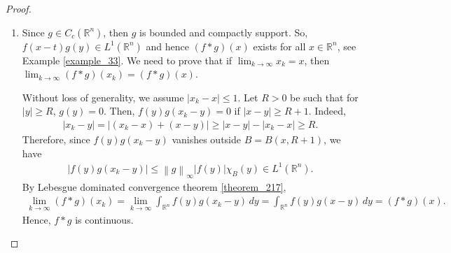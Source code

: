 \documentclass[11pt]{book}
\theoremstyle{definition}
\numberwithin{equation}{chapter}
\begin{document}
\begin{proof}
~\begin{enumerate}[label=(\alph*)]
    \item Since $g \in C_c(\mathbb{R}^n)$, then $g$ is bounded and compactly support. So, $f(x - t)g(y) \in L^1(\mathbb{R}^n)$ and hence $(f*g)(x)$ exists for all $x \in \mathbb{R}^n$, see Example \ref{example_33}. We need to prove that if $\lim_{k\to\infty} x_k = x$, then $\lim_{k\to\infty} (f*g)(x_k) = (f*g)(x)$. 
    
    Without loss of generality, we assume $\left|x_k - x\right| \leq 1$. Let $R > 0$ be such that for $\left|y\right| \geq R$, $g(y) = 0$. Then, $f(y)g(x_k - y) = 0$ if $\left|x - y\right| \geq R + 1$. Indeed,
    \begin{align*}
        \left|x_k - y\right| = \left|(x_k - x) + (x - y)\right| \geq \left|x - y\right| - \left|x_k - x\right| \geq R.
    \end{align*}
    Therefore, since $f(y)g(x_k - y)$ vanishes outside $B = B(x,R+1)$, we have
    \begin{align*}
        \left|f(y)g(x_k - y)\right| \leq \left\|g\right\|_{\infty} \left|f(y)\right| \chi_{B}(y) \in L^1(\mathbb{R}^n).
    \end{align*}
    By Lebesgue dominated convergence theorem \ref{theorem_217},
    \begin{align*}
        \lim_{k\to\infty}(f*g)(x_k) = \lim_{k\to\infty} \int_{\mathbb{R}^n} f(y)g(x_k - y)\, dy = \int_{\mathbb{R}^n} f(y)g(x - y)\, dy = (f*g)(x).
    \end{align*}
    Hence, $f*g$ is continuous.
    

\end{enumerate}
\end{proof}
\end{document}
